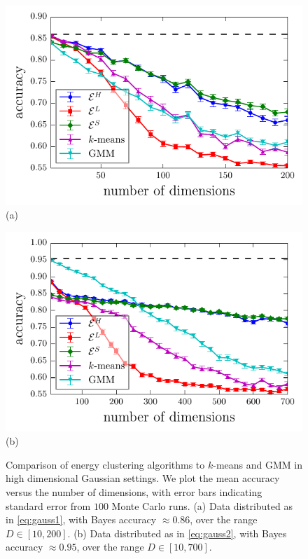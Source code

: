 \documentclass[aps,preprint,nofootinbib,floatfix]{revtex4-1}
\begin{document}
\begin{figure}
\begin{minipage}{0.49\textwidth}
\includegraphics[width=1\textwidth]{normal_highdim_mean.pdf}\\[-1.0em] (a)
\end{minipage}
\begin{minipage}{0.49\textwidth}
\includegraphics[width=1\textwidth]{normal_highdim_cov.pdf}\\[-1.0em] (b)
\end{minipage}
\caption{
\label{fig:gauss}
Comparison of energy clustering algorithms to $k$-means and GMM in 
high dimensional Gaussian settings. We plot the mean accuracy versus
the number of dimensions, with error bars indicating standard 
error from $100$ Monte
Carlo runs.
(a) Data distributed as in \eqref{eq:gauss1}, with Bayes
accuracy $\approx 0.86$, over the range $D \in [10,200]$. 
(b) Data distributed
as in \eqref{eq:gauss2}, with Bayes accuracy $\approx 0.95$,
over the range $D \in [10, 700]$.
}
\end{figure}
\end{document}
